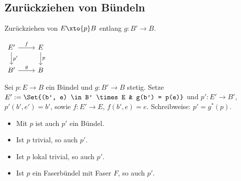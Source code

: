 \subsection{Zurückziehen von Bündeln}

Zurückziehen von $E \xto{p} B$ entlang $g: B' \to B$.

\begin{math}
    \begin{tikzcd}
        E' \ar[d,"p'"] \ar[r,"f"] & E \ar[d,"p"] \\
        B' \ar[r,"g"] & B
    \end{tikzcd}
\end{math}

\begin{df}
    Sei $p: E \to B$ ein Bündel und $g: B' \to B$ stetig.
    Setze
    \begin{math}
        E' := \Set{(b', e) \in B' \times E & g(b') = p(e)}
    \end{math}
    und $p': E' \to B'$, $p'(b', e') = b'$, sowie $f: E' \to E$, $f(b', e) = e$.
    Schreibweise: $p' = g^*(p)$.
    \begin{note}
        \begin{itemize}
            \item
                Mit $p$ ist auch $p'$ ein Bündel.
            \item
                Ist $p$ trivial, so auch $p'$.
            \item
                Ist $p$ lokal trivial, so auch $p'$.
            \item
                Ist $p$ ein Faserbündel mit Faser $F$, so auch $p'$.
        \end{itemize}
    \end{note}
\end{df}


